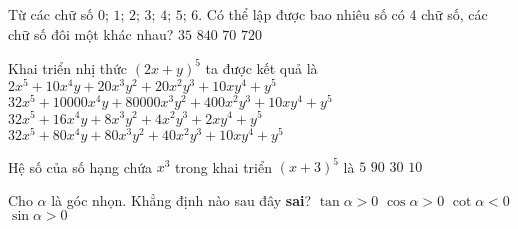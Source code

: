 \begin{ex}%
	Từ các chữ số $0$; $1$; $2$; $3$; $4$; $5$; $6$. Có thể lập được bao nhiêu số có 4 chữ số, các chữ số đôi một khác nhau?
	\choice
	{$35$}
	{$840$}
	{$70$}
	{\True$720$}
\end{ex}

\begin{ex}%
	Khai triển nhị thức $(2x+y)^5$ ta được kết quả là
	\choice
	{$2x^5+10x^4y+20x^3y^2+20x^2y^3+10xy^4+y^5$}
	{$32x^5+10000x^4y+80000x^3y^2+400x^2y^3+10xy^4+y^5$}
	{$32x^5+16x^4y+8x^3y^2+4x^2y^3+2xy^4+y^5$}
	{\True$32x^5+80x^4y+80x^3y^2+40x^2y^3+10xy^4+y^5$}
\end{ex}

\begin{ex}%
	Hệ số của số hạng chứa $x^3$ trong khai triển $(x+3)^5$ là
	\choice
	{$5$}
	{\True $90$}
	{$30$}
	{$10$}
\end{ex}

\begin{ex}%
	Cho $\alpha$ là góc nhọn. Khẳng định nào sau đây \textbf{sai}?
	\choice
	{$\tan\alpha>0$}
	{$\cos\alpha>0$}
	{\True $\cot\alpha<0$}
	{$\sin\alpha>0$}
\end{ex}

